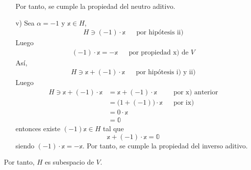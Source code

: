 \begin{theorem}
\begin{enumerate}
        Por tanto, se cumple la propiedad del neutro aditivo.
        \item[v)] Sea $\alpha = -1$ y $\mathbb{x} \in H$,
        \begin{align*}
            H \ni (-1) \cdot \mathbb{x} && \text{por hipótesis ii)}
        \end{align*}
        Luego
        \begin{align*}
            (-1) \cdot \mathbb{x} = -\mathbb{x} && \text{por propiedad x) de $V$}
        \end{align*}
        Así,
        \begin{align*}
            H \ni \mathbb{x} + (-1) \cdot \mathbb{x} && \text{por hipótesis i) y ii)}
        \end{align*}
        Luego
        \begin{align*}
            H \ni \mathbb{x} + (-1) \cdot \mathbb{x} & = \mathbb{x} + (-1) \cdot \mathbb{x} && \text{por x) anterior} \\
            & = \big( 1 + (-1) \big) \cdot \mathbb{x} && \text{por ix)} \\
            & = 0 \cdot \mathbb{x} \\
            & = \mathbb{0}
        \end{align*}
        entonces existe $(-1) \mathbb{x} \in H$ tal que
        $$\mathbb{x} + (-1) \cdot \mathbb{x} = \mathbb{0}$$
        siendo $(-1) \cdot \mathbb{x}  = -\mathbb{x}$. Por tanto, se cumple la propiedad del inverso aditivo.
    \end{enumerate}
    Por tanto, $H$ es subespacio de $V$.
\end{theorem}


